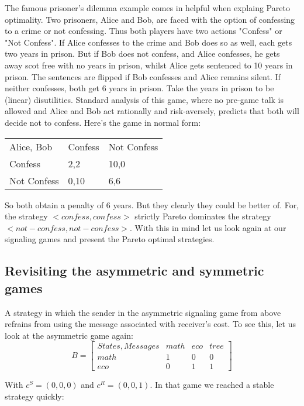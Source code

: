 \documentclass[10]{article}
\begin{document}
The famous prisoner's dilemma example comes in helpful when explaing Pareto optimality. Two prisoners, Alice and Bob, are faced with the option of confessing to a crime or not confessing. Thus both players have two actions "Confess" or "Not Confess". If Alice confesses to the crime and Bob does so as well, each gets two years in prison. But if Bob does not confess, and Alice confesses, he gets away scot free with no years in prison, whilst Alice gets sentenced to 10 years in prison. The sentences are flipped if Bob  confesses and Alice remains silent. If neither confesses, both get 6 years in prison. Take the years in prison to be (linear) disutilities. Standard analysis of this game, where no pre-game talk is allowed and Alice and Bob act rationally and risk-aversely, predicts that both will decide not to confess. Here's the game in normal form:
\begin{table}[h]
\centering
\begin{tabular}{lll}
Alice, Bob   & Confess & Not Confess \\
Confess           & 2,2     & 10,0    \\
Not Confess        & 0,10    & 6,6
\end{tabular}
\end{table}
So both obtain a penalty of 6 years. But they clearly they could be better of. For, the strategy $<confess, confess>$ strictly Pareto dominates the strategy $<not-confess,not-confess>$.
With this in mind let us look again at our signaling games and present the Pareto optimal strategies.

\subsection{Revisiting the asymmetric and symmetric games}
A strategy in which the sender in the asymmetric signaling game from above refrains from using the message associated with receiver's cost. To see this, let us look at the asymmetric game again:
 \begin{equation*}
 B =
 \begin{bmatrix}

 States, Messages & math & eco & tree \\
 math             & 1    & 0   & 0    \\
 eco              & 0    & 1   & 1
 \end{bmatrix}
 \end{equation*}

 With $c^S=(0,0,0)$ and $c^R=(0,0,1)$. In that game we reached a stable strategy quickly:
\end{document}
